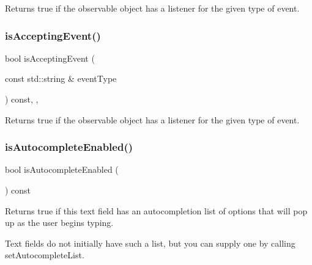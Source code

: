 Returns true if the observable object has a listener for the given type of event. 

\mbox{\label{classGObservable_a3b1c689267eda44e65a2213e7de38b23}} 
\subsubsection{\texorpdfstring{is\+Accepting\+Event()}{isAcceptingEvent()}\hspace{0.1cm}{\footnotesize\ttfamily [3/3]}}
{\footnotesize\ttfamily bool is\+Accepting\+Event (\begin{DoxyParamCaption}\item[{const std\+::string \&}]{event\+Type }\end{DoxyParamCaption}) const\hspace{0.3cm}{\ttfamily [protected]}, {\ttfamily [virtual]}, {\ttfamily [inherited]}}



Returns true if the observable object has a listener for the given type of event. 

\mbox{\label{classGTextField_a7528cfb0542ac5268efe1d7362b89344}} 
\subsubsection{\texorpdfstring{is\+Autocomplete\+Enabled()}{isAutocompleteEnabled()}}
{\footnotesize\ttfamily bool is\+Autocomplete\+Enabled (\begin{DoxyParamCaption}{ }\end{DoxyParamCaption}) const\hspace{0.3cm}{\ttfamily [virtual]}}



Returns true if this text field has an autocompletion list of options that will pop up as the user begins typing. 

Text fields do not initially have such a list, but you can supply one by calling set\+Autocomplete\+List. \mbox{\label{classGTextField_a012b5afb54e037e6c5498cf0932a521b}} 
